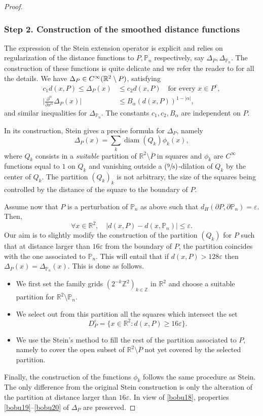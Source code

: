 \documentclass[11pt]{article}
\numberwithin{equation}{section}\newtheorem*{jepEnonce}{\jepEnonceTitle}\newenvironment{enonce*}[1]{\def\jepEnonceTitle{#1}\jepEnonce}{\endjepEnonce}\newtheorem*{conj*}{Conjecture}
\newcommand{\Psfrac}[2]{(\sfrac{#1}{#2})}
\theoremstyle{plain}
\theoremstyle{definition}
\newcommand{\diam}{\operatorname{diam}}
\let\Bbb\mathbb
\def\R{\mathbb{R}}
\def\Z{\mathbb{Z}}
\newcommand{\vps}{\varepsilon}
\let\jepOriginalSfrac\sfrac
\renewcommand{\sfrac}[2]{{\jepOriginalSfrac{#1}{#2}}}
\begin{document}
\begin{proof}
\subsubsection*{Step 2. Construction of the smoothed distance functions} The expression of the Stein extension operator is explicit and relies on regularization of the distance functions to $P, \Bbb P_n$ respectively, say $\Delta_P, \Delta_{\Bbb P_n}$. The construction of these functions is quite delicate and we refer the reader to \cite[Th.\,2, p.\,171]{St70} for all the details. We have $\Delta_P \in C^\infty(\R^2 \setminus\nobreak P)$, satisfying
\begin{align}\label{bobu19}
c_1 d(x, P)\le \Delta _P (x) &\le c_2 d(x, P) \quad\text{for every } x \in P^c,
\\
\label{bobu20}
\Big |\frac{\partial^\alpha}{\partial x^\alpha} \Delta_P (x)\Big |&\le B_\alpha (d(x, P))^{1-|\alpha|},
\end{align}
and similar inequalities for $\Delta_{\Bbb P_n}$. The constants $c_1,c_2, B_\alpha$ are independent on $P$.

In its construction, Stein gives a precise formula for $\Delta_P$, namely
\[
\Delta_P(x) = \sum_k \diam (Q_k) \phi_k(x),
\]
where $Q_k$ consists in a {\it suitable} partition of $\R^2\setminus \overline P$ in squares and $\phi_k$ are $C^\infty$ functions equal to $1$ on $Q_k$ and vanishing outside a $\Psfrac 98$-dilation of $Q_k$ by the center of $Q_k$. The partition $(Q_k)_k$ is not arbitrary, the size of the squares being controlled by the distance of the square to the boundary of $P$.

Assume now that $P$ is a perturbation of $\Bbb P_n$ as above such that $d_H(\partial P, \partial \Bbb P_n) =\vps$. Then,
\begin{equation}\label{bobu18}
\forall x \in \R^2, \quad |d(x, P)-d(x, \Bbb P_n)| \le \vps.
\end{equation}
Our aim is to slightly modify the construction of the partition $(Q_k)$ for $P$ such that at distance larger than $16 \vps$ from the boundary of $P$, the partition coincides with the one associated to $\Bbb P_n$. This will entail that if $d(x, P) > 128 \vps$ then $\Delta_P(x) =\Delta_{\Bbb P_n}(x)$. This is done as follows.
\begin{itemize}
\item We first set the family grids $(2^{-k} \Z^2)_{k \in \Z}$ in $\R^2$ and choose a suitable partition for $\R^2\setminus \Bbb P_n$.
\item We select out from this partition all the squares which intersect the set
\[
D^\vps_P=\{x\in \R^2 : d(x, P) \ge 16 \vps\}.
\]
\item We use the Stein's method to fill the rest of the partition associated to $P$, namely to cover the open subset of $\R^2 \setminus \overline P$ not yet covered by the selected partition.
\end{itemize}
Finally, the construction of the functions $\phi_k$ follows the same procedure as Stein. The only difference from the original Stein construction is only the alteration of the partition at distance larger than $16\vps$. In view of \eqref{bobu18}, properties \eqref{bobu19}--\eqref{bobu20} of $\Delta_P$ are preserved.


\end{proof}
\end{document}
